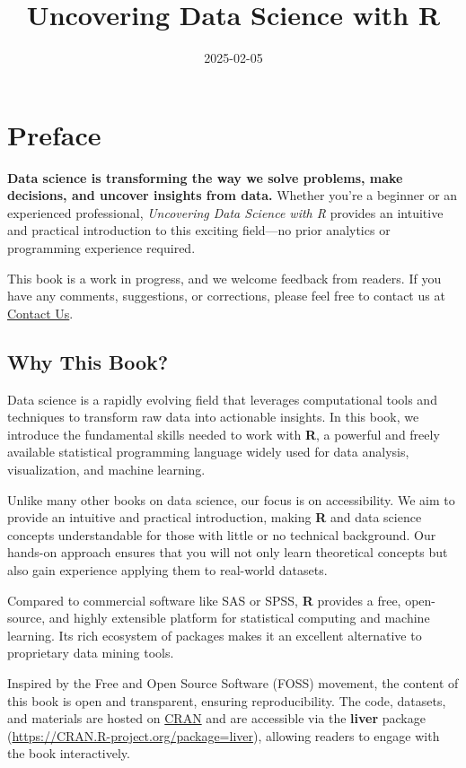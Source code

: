 \documentclass[
]{book}
\title{Uncovering Data Science with R}
\author{}
\date{\vspace{-2.5em}2025-02-05}
\theoremstyle{definition}
\theoremstyle{definition}
\theoremstyle{definition}
\theoremstyle{definition}
\theoremstyle{remark}
\begin{document}
\maketitle

{
\setcounter{tocdepth}{1}
\tableofcontents
}
\chapter*{Preface}\label{preface}

\textbf{Data science is transforming the way we solve problems, make decisions, and uncover insights from data.} Whether you're a beginner or an experienced professional, \emph{Uncovering Data Science with R} provides an intuitive and practical introduction to this exciting field---no prior analytics or programming experience required.

This book is a work in progress, and we welcome feedback from readers. If you have any comments, suggestions, or corrections, please feel free to contact us at \href{mailto:a.mohammadi@uva.nl}{Contact Us}.

\section*{Why This Book?}\label{why-this-book}

Data science is a rapidly evolving field that leverages computational tools and techniques to transform raw data into actionable insights. In this book, we introduce the fundamental skills needed to work with \textbf{R}, a powerful and freely available statistical programming language widely used for data analysis, visualization, and machine learning.

Unlike many other books on data science, our focus is on accessibility. We aim to provide an intuitive and practical introduction, making \textbf{R} and data science concepts understandable for those with little or no technical background. Our hands-on approach ensures that you will not only learn theoretical concepts but also gain experience applying them to real-world datasets.

Compared to commercial software like SAS or SPSS, \textbf{R} provides a free, open-source, and highly extensible platform for statistical computing and machine learning. Its rich ecosystem of packages makes it an excellent alternative to proprietary data mining tools.

Inspired by the Free and Open Source Software (FOSS) movement, the content of this book is open and transparent, ensuring reproducibility. The code, datasets, and materials are hosted on \href{https://cran.r-project.org/web/packages/liver/index.html}{CRAN} and are accessible via the \textbf{liver} package (\url{https://CRAN.R-project.org/package=liver}), allowing readers to engage with the book interactively.
\end{document}
